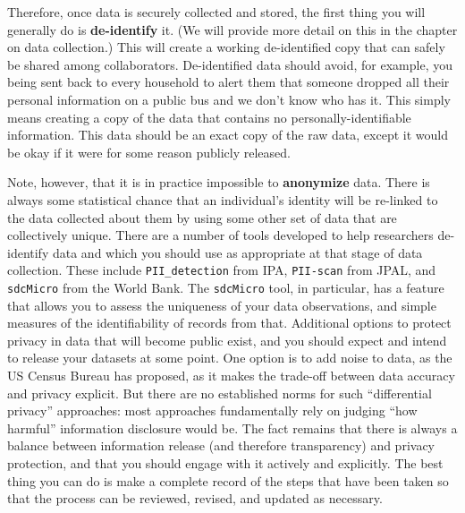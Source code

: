 Therefore, once data is securely collected and stored,
the first thing you will generally do is \textbf{de-identify} it.
(We will provide more detail on this in the chapter on data collection.)
This will create a working de-identified copy
that can safely be shared among collaborators.
De-identified data should avoid, for example,
you being sent back to every household
to alert them that someone dropped all their personal information
on a public bus and we don't know who has it.
This simply means creating a copy of the data
that contains no personally-identifiable information.
This data should be an exact copy of the raw data,
except it would be okay if it were for some reason publicly released.\cite{matthews2011data}

Note, however, that it is in practice impossible to \textbf{anonymize} data.
There is always some statistical chance that an individual's identity
will be re-linked to the data collected about them
by using some other set of data that are collectively unique.
There are a number of tools developed to help researchers de-identify data
and which you should use as appropriate at that stage of data collection.
These include \texttt{PII\_detection} from IPA,
\texttt{PII-scan} from JPAL,
and \texttt{sdcMicro} from the World Bank.
The \texttt{sdcMicro} tool, in particular, has a feature
that allows you to assess the uniqueness of your data observations,
and simple measures of the identifiability of records from that.
Additional options to protect privacy in data that will become public exist,
and you should expect and intend to release your datasets at some point.
One option is to add noise to data, as the US Census Bureau has proposed,
as it makes the trade-off between data accuracy and privacy explicit.
But there are no established norms for such ``differential privacy'' approaches:
most approaches fundamentally rely on judging ``how harmful'' information disclosure would be.
The fact remains that there is always a balance between information release (and therefore transparency)
and privacy protection, and that you should engage with it actively and explicitly.
The best thing you can do is make a complete record of the steps that have been taken
so that the process can be reviewed, revised, and updated as necessary.

